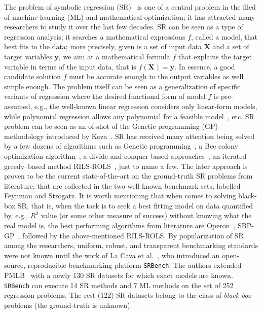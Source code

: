 \documentclass{bmcart}
\begin{document}
The problem of symbolic regression (SR)~\cite{billard2002symbolic} is one of a central problem in the filed of machine learning (ML) and mathematical optimization; it has attracted many researchers to study it over the last few decades. 
SR can be seen as  a type of regression analysis; it  searches a mathematical expressions $f$, called a model,  that best fits to the data; more precisely,  given is a set of input data $\textbf{X}$ and a set of target variables $\textbf{y}$, we aim at a mathematical formula $f$ that explains the target variable in terms of the input data, that is $f(\textbf{X}) = \textbf{y}$. In essence, a good candidate solution $f$ must be accurate enough to the output variables as well simple enough. The problem itself can be seen as a generalization of specific variants of regression where the desired functional form of model $f$ is pre-assumed, e.g., the well-known linear regression considers only linear-form models, while polynomial regression allows any polynomial for a feasible model~\cite{stimson1978interpreting}, etc. SR problem can be seen as an of-shot of the Genetic programming (GP) methodology introduced by Koza~\cite{koza1994genetic}.  SR has received many attention being solved by a few dozens of algorithms such as Genetic programming~\cite{augusto2000symbolic}, a Bee colony optimization algorithm~\cite{karaboga2012artificial}, a divide-and-conquer based approaches~\cite{udrescu2020ai}, an iterated greedy--based method RILS-ROLS~\cite{kartelj2023rils}, just to name a few.  The later approach is proven to be  the current state-of-the-art on the ground-truth SR problems from literature, that are collected in the two well-known benchmark sets, labelled Feynman and Strogatz. It is worth mentioning that when comes to solving  black-box SR, that is, when the task is to seek a best fitting model on data quantified by, e.g.,  $R^2$ value (or some other measure of success) without knowing what the real model is, the best performing algorithms from literature are  Operon~\cite{burlacu2020operon}, SBP-GP~\cite{virgolin2019linear}, followed by the above-mentioned RILS-ROLS. By popularization of SR among the researchers, uniform, robust, and transparent
benchmarking standards were not known until the work of  La Cava et al.~\cite{la2021contemporary}, who  introduced an open-source, reproducible benchmarking platform \texttt{SRBench}. The authors extended  PMLB~\cite{olson2017pmlb} with a newly 130 SR datasets for which exact models are known. \texttt{SRBench} can execute 14 SR methods and 7 ML methods on the set of 252  regression problems. The rest (122) SR datasets belong to the class of  \emph{black-box} problems (the ground-truth is unknown).
\end{document}
